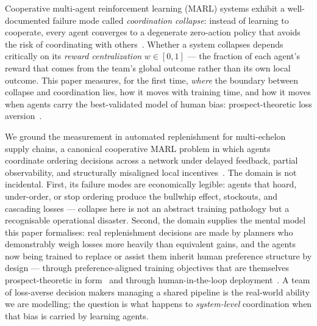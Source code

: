 \documentclass[11pt]{article}
\begin{document}
Cooperative multi-agent reinforcement learning (MARL) systems exhibit a
well-documented failure mode called \emph{coordination collapse}: instead
of learning to cooperate, every agent converges to a degenerate
zero-action policy that avoids the risk of coordinating with
others~\citep{liu2023lazy,peng2023curo}.
Whether a system collapses depends critically on its \emph{reward
centralization} $w \in [0,1]$ --- the fraction of each agent's reward
that comes from the team's global outcome rather than its own local
outcome.
This paper measures, for the first time, \emph{where} the boundary
between collapse and coordination lies, how it moves with training time,
and how it moves when agents carry the best-validated model of human
bias: prospect-theoretic loss aversion~\citep{kahneman1979,tversky1992}.

We ground the measurement in automated replenishment for multi-echelon
supply chains, a canonical cooperative MARL problem in which agents
coordinate ordering decisions across a network under delayed feedback,
partial observability, and structurally misaligned local
incentives~\citep{oroojlooyjadid2022,gijsbrechts2022}.
The domain is not incidental.
First, its failure modes are economically legible: agents that hoard,
under-order, or stop ordering produce the bullwhip effect, stockouts, and
cascading losses --- collapse here is not an abstract training pathology
but a recognisable operational disaster.
Second, the domain supplies the mental model this paper formalises:
real replenishment decisions are made by planners who demonstrably weigh
losses more heavily than equivalent gains, and the agents now being
trained to replace or assist them inherit human preference structure by
design --- through preference-aligned training objectives that are
themselves prospect-theoretic in form~\citep{ethayarajh2024kto} and
through human-in-the-loop deployment~\citep{lalmohammed2025}.
A team of loss-averse decision makers managing a shared pipeline is the
real-world ability we are modelling; the question is what happens to
\emph{system-level} coordination when that bias is carried by learning
agents.
\end{document}
